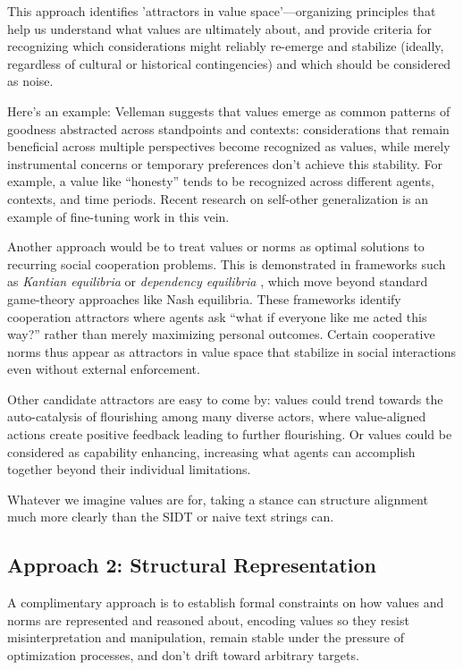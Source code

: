 This approach identifies 'attractors in value space'—organizing principles that help us understand what values are ultimately about, and provide criteria for recognizing which considerations might reliably re-emerge and stabilize (ideally, regardless of cultural or historical contingencies) and which should be considered as noise.

Here's an example: Velleman \cite{velleman1989, velleman2009} suggests that values emerge as common patterns of goodness abstracted across standpoints and contexts: considerations that remain beneficial across multiple perspectives become recognized as values, while merely instrumental concerns or temporary preferences don't achieve this stability. For example, a value like ``honesty'' tends to be recognized across different agents, contexts, and time periods. Recent research on self-other generalization \cite{carauleanu2024safehonestaiagents} is an example of fine-tuning work in this vein.

Another approach would be to treat values or norms as optimal solutions to recurring social cooperation problems. This is demonstrated in frameworks such as \textit{Kantian equilibria} \cite{roemer2010} or \textit{dependency equilibria} \cite{spohn2003}, which move beyond standard game-theory approaches like Nash equilibria. These frameworks identify cooperation attractors where agents ask ``what if everyone like me acted this way?'' rather than merely maximizing personal outcomes. Certain cooperative norms thus appear as attractors in value space that stabilize in social interactions even without external enforcement.

Other candidate attractors are easy to come by: values could trend towards the auto-catalysis of flourishing among many diverse actors, where value-aligned actions create positive feedback leading to further flourishing. Or values could be considered as capability enhancing, increasing what agents can accomplish together beyond their individual limitations.

Whatever we imagine values are for, taking a stance can structure alignment much more clearly than the SIDT or naive text strings can.

\subsection{Approach 2: Structural Representation}

A complimentary approach is to establish formal constraints on how values and norms are represented and reasoned about, encoding values so they resist misinterpretation and manipulation, remain stable under the pressure of optimization processes, and don't drift toward arbitrary targets.

